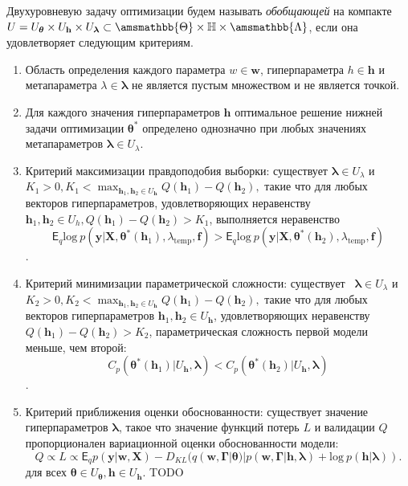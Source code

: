 \begin{defin}
Двухуровневую задачу оптимизации будем называть \textit{обобщающей} на компакте $U = U_{\boldsymbol{\theta}} \times U_{\mathbf{h}} \times U_{\boldsymbol{\lambda}} \subset \amsmathbb{\Theta} \times \mathbb{H} \times \amsmathbb{\Lambda}$, если она удовлетворяет следующим критериям.
\begin{enumerate}
\item Область определения каждого параметра $w \in \mathbf{w}$, гиперпараметра $h \in \mathbf{h}$ и метапараметра $\lambda \in \boldsymbol{\lambda}$ не  является пустым множеством и не является точкой.
\item Для каждого значения гиперпараметров $\mathbf{h}$ оптимальное решение нижней задачи оптимизации $\boldsymbol{\theta}^{*}$ определено однозначно при любых значениях метапараметров $\boldsymbol{\lambda} \in U_{\lambda}$.

\item Критерий максимизации правдоподобия выборки: существует $\boldsymbol{\lambda} \in U_{\lambda}$ и  $K_1>0, K_1 < \max_{\mathbf{h}_1, \mathbf{h}_2 \in U_\mathbf{h}} Q(\mathbf{h}_1) - Q(\mathbf{h}_2),$ такие что для любых векторов гиперпараметров, удовлетворяющих неравенству $\mathbf{h}_1, \mathbf{h}_2 \in U_{h}, Q(\mathbf{h}_1)-Q(\mathbf{h}_2) > K_1$, выполняется неравенство $$\mathsf{E}_q \text{log}~p(\mathbf{y}|\mathbf{X}, \boldsymbol{\theta}^{*}(\mathbf{h}_1), \lambda_{\text{temp}}, \mathbf{f})>\mathsf{E}_q \text{log}~p(\mathbf{y}|\mathbf{X}, \boldsymbol{\theta}^{*}(\mathbf{h}_2), \lambda_{\text{temp}}, \mathbf{f})$$.

\item Критерий минимизации параметрической сложности:  существует  $\boldsymbol{\lambda} \in U_{\lambda}$ и $K_2>0,$$K_2 < \max_{\mathbf{h}_1, \mathbf{h}_2 \in U_\mathbf{h}} Q(\mathbf{h}_1) - Q(\mathbf{h}_2),$  такие что для любых векторов гиперпараметров $\mathbf{h}_1, \mathbf{h}_2 \in U_\mathbf{h}$, удовлетворяющих неравенству $Q(\mathbf{h}_1)-Q(\mathbf{h}_2) > K_2$, параметрическая сложность первой модели меньше, чем второй: $$C_p(\boldsymbol{\theta}^{*}(\mathbf{h}_1)|U_\mathbf{h},\boldsymbol{\lambda})<C_p(\boldsymbol{\theta}^{*}(\mathbf{h}_2)|U_\mathbf{h},\boldsymbol{\lambda})$$.

\item Критерий приближения оценки обоснованности: существует значение гиперпараметров $\boldsymbol{\lambda}$, такое что значение функций потерь $L$ и валидации $Q$ пропорционален вариационной оценки обоснованности модели: $$Q \propto  L \propto 
\mathsf{E}_q p(\mathbf{y}|\mathbf{w}, \mathbf{X})-{D}_{KL}(q(\mathbf{w}, \boldsymbol{\Gamma}|\boldsymbol{\theta})|p(\mathbf{w}, \boldsymbol{\Gamma}|\mathbf{h}, \boldsymbol{\lambda}) + \text{log}~p(\mathbf{h}|\boldsymbol{\lambda})).
$$ для всех $\boldsymbol{\theta}\in U_{\boldsymbol{\theta}}, \mathbf{h} \in U_{\mathbf{h}}.$ TODO


\end{enumerate}
\end{defin}
